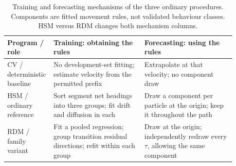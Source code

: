 \begin{table}[!htbp]\centering\small
\caption{Training and forecasting mechanisms of the three ordinary procedures. Components are fitted movement rules, not validated behaviour classes. HSM versus RDM changes both mechanism columns.}
\label{tab:procedure-mechanisms}
\begin{tabular}{@{}p{0.15\linewidth}p{0.39\linewidth}p{0.39\linewidth}@{}}\toprule
Program / role & Training: obtaining the rules & Forecasting: using the rules\\\midrule
CV / deterministic baseline & No development-set fitting; estimate velocity from the permitted prefix & Extrapolate at that velocity; no component draw\\
HSM / ordinary reference & Sort segment net headings into three groups; fit drift and diffusion in each & Draw a component per particle at the origin; keep it throughout the path\\
RDM / family variant & Fit a pooled regression; group transition residual directions; refit within each group & Draw at the origin; independently redraw every $\tau$, allowing the same component\\\bottomrule
\end{tabular}
\end{table}
